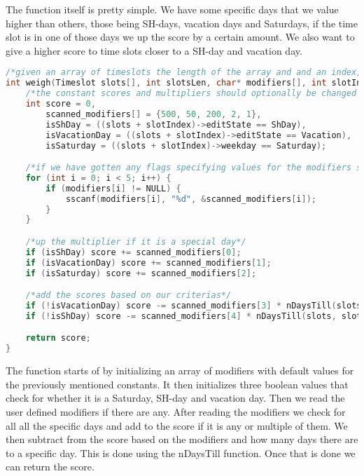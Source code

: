 The function itself is pretty simple. We have some specific days that we value higher than others, those being SH-days, vacation days and Saturdays, if the time slot is in one of those days we up the score by a certain amount. We also want to give a higher score to time slots closer to a SH-day and vacation day. 

\begin{lstlisting}[caption={Weigh function},label={lst:weigh`},language=C]
/*given an array of timeslots the length of the array and and an index, return the score of the timeslot of that index*/
int weigh(Timeslot slots[], int slotsLen, char* modifiers[], int slotIndex) {
    /*the constant scores and multipliers should optionally be changed by flags*/
    int score = 0, 
        scanned_modifiers[] = {500, 50, 200, 2, 1},
        isShDay = ((slots + slotIndex)->editState == ShDay),
        isVacationDay = ((slots + slotIndex)->editState == Vacation),
        isSaturday = ((slots + slotIndex)->weekday == Saturday);

    /*if we have gotten any flags specifying values for the modifiers scan them and assign the value*/
    for (int i = 0; i < 5; i++) {
        if (modifiers[i] != NULL) {
            sscanf(modifiers[i], "%d", &scanned_modifiers[i]); 
        }
    }

    /*up the multiplier if it is a special day*/
    if (isShDay) score += scanned_modifiers[0];
    if (isVacationDay) score += scanned_modifiers[1];
    if (isSaturday) score += scanned_modifiers[2];

    /*add the scores based on our criterias*/
    if (!isVacationDay) score -= scanned_modifiers[3] * nDaysTill(slots, slotsLen, slotIndex, Vacation);
    if (!isShDay) score -= scanned_modifiers[4] * nDaysTill(slots, slotsLen, slotIndex, ShDay);

    return score;
}
\end{lstlisting}
The function starts of by initializing an array of modifiers with default values for the previously mentioned constants. It then initializes three boolean values that check for whether it is a Saturday, SH-day and vacation day. Then we read the user defined modifiers if there are any. After reading the modifiers we check for all all the specific days and add to the score if it is any or multiple of them. We then subtract from the score based on the modifiers and how many days there are to a specific day. This is done using the nDaysTill function. Once that is done we can return the score.

